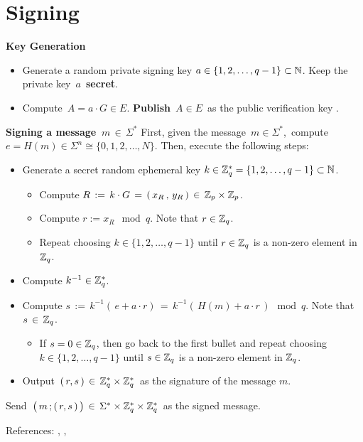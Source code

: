 
\section{Signing}
\setcounter{theorem}{0}
\setcounter{equation}{0}

\vskip 0.2cm
\noindent
\textbf{Key Generation}
\begin{itemize}
\item
	Generate a random private signing key $a \in \{1,2,\ldots,q-1\} \subset \mathbb{N}$.
	Keep the private key \,$a$\, \textbf{\color{red}secret}.
\item
	Compute \,$A = a \cdot G \in E$.
	\textbf{\color{red}Publish} \,$A \in E$\, as the public verification key .
\end{itemize}

\vskip 0.3cm
\noindent
\textbf{Signing a message \,$m \,\in\, \Sigma^{*}$}
\vskip 0.3cm
\noindent
First, given the message \,$m \in \Sigma^{*}$,\,
compute \,$e = H(m) \in \Sigma^{n} \cong \{0,1,2,\ldots,N\}$.
\vskip 0.3cm
\noindent
Then, execute the following steps:
\begin{itemize}
\item
	Generate a secret random ephemeral key $k \in \mathbb{Z}_{q}^{*} = \{1,2,\ldots,q-1\} \subset \mathbb{N}$.
	\begin{itemize}
	\item
		Compute $R \, := \, k \cdot G \,=\, \left(\,x_{R}\,,\,y_{R}\,\right) \,\in\, \mathbb{Z}_{p} \times \mathbb{Z}_{p}$.
	\item
		Compute $r := x_{R} \!\mod q$.\; Note that $r \in \mathbb{Z}_{q}$.
	\item
		Repeat choosing $k \in \{1,2,\ldots,q-1\}$ until $r \in \mathbb{Z}_{q}$ is a non-zero element in $\mathbb{Z}_{q}$.
	\end{itemize}
\item
	Compute $k^{-1} \in \mathbb{Z}_{q}^{*}$.
\item
	Compute $s \, := \, k^{-1}\left(\,e + a \cdot r\right) \, = \, k^{-1}\left(\,H(m) + a \cdot r\,\right)\!\!\mod q$.\;
	Note that $s \,\in\, \mathbb{Z}_{q}$.
	\begin{itemize}
	\item
		If $s = 0 \in \mathbb{Z}_{q}$, then go back to the first bullet and
		repeat choosing $k \in \{1,2,\ldots,q-1\}$
		until $s \in \mathbb{Z}_{q}$ is a non-zero element in $\mathbb{Z}_{q}$.
	\end{itemize}
\item
	Output \,$(\,r,s\,) \,\in\, \mathbb{Z}_{q}^{*} \times \mathbb{Z}_{q}^{*}$\,
	as the signature of the message $m$.
\end{itemize}
\vskip 0.3cm
\noindent
Send
\,$\left(\,m \,\overset{{\color{white}.}}{;}\,(\,r,s\,)\,\right) \,\in\, \Sigma^{*} \times \Z_{q}^{*} \times \Z_{q}^{*}$\,
as the signed message.

\vskip 0.5cm
\noindent
References: \cite{Yan2013}, \cite{Paar2010}, \cite{Garrett2005}
